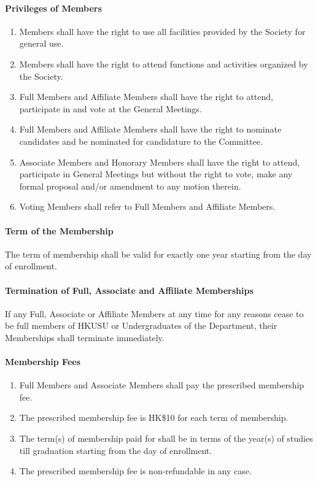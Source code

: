 \documentclass[11pt,a4paper,notitlepage]{article}
\begin{document}
	\paragraph{Privileges of Members}
	\begin{enumerate}
		\item Members shall have the right to use all facilities provided by the Society for general use. 
		\item Members shall have the right to attend functions and activities organized by the Society. 
		\item Full Members and Affiliate Members shall have the right to attend, participate in and vote at the General Meetings. 
		\item Full Members and Affiliate Members shall have the right to nominate candidates and be nominated for candidature to the Committee. 
		\item Associate Members and Honorary Members shall have the right to attend, participate in General Meetings but without the right to vote, make any formal proposal and/or amendment to any motion therein. 
		\item Voting Members shall refer to Full Members and Affiliate Members. 
	\end{enumerate}
	
	\paragraph{Term of the Membership} 
	The term of membership shall be valid for exactly one year starting from the day of enrollment. 
	
	\paragraph{Termination of Full, Associate and Affiliate Memberships} 
	If any Full, Associate or Affiliate Members at any time for any reasons cease to be full members of HKUSU or Undergraduates of the Department, their Memberships shall terminate immediately. 
	
	\paragraph{Membership Fees} 
	\begin{enumerate}
		\item Full Members and Associate Members shall pay the prescribed membership fee. 
		\item The prescribed membership fee is HK\$10 for each term of membership. 
		\item The term(s) of membership paid for shall be in terms of the year(s) of studies till graduation starting from the day of enrollment. 
		\item The prescribed membership fee is non-refundable in any case.
	\end{enumerate}
	
\end{document}
